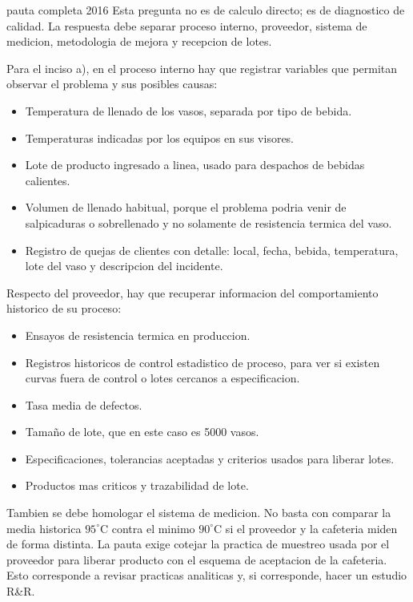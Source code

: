 \begin{pautacompleta}{pauta completa 2016}
Esta pregunta no es de calculo directo; es de diagnostico de calidad. La respuesta debe separar proceso interno, proveedor, sistema de medicion, metodologia de mejora y recepcion de lotes.

Para el inciso a), en el proceso interno hay que registrar variables que permitan observar el problema y sus posibles causas:
\begin{itemize}
  \item Temperatura de llenado de los vasos, separada por tipo de bebida.
  \item Temperaturas indicadas por los equipos en sus visores.
  \item Lote de producto ingresado a linea, usado para despachos de bebidas calientes.
  \item Volumen de llenado habitual, porque el problema podria venir de salpicaduras o sobrellenado y no solamente de resistencia termica del vaso.
  \item Registro de quejas de clientes con detalle: local, fecha, bebida, temperatura, lote del vaso y descripcion del incidente.
\end{itemize}

Respecto del proveedor, hay que recuperar informacion del comportamiento historico de su proceso:
\begin{itemize}
  \item Ensayos de resistencia termica en produccion.
  \item Registros historicos de control estadistico de proceso, para ver si existen curvas fuera de control o lotes cercanos a especificacion.
  \item Tasa media de defectos.
  \item Tamaño de lote, que en este caso es 5000 vasos.
  \item Especificaciones, tolerancias aceptadas y criterios usados para liberar lotes.
  \item Productos mas criticos y trazabilidad de lote.
\end{itemize}

Tambien se debe homologar el sistema de medicion. No basta con comparar la media historica $95^\circ\text{C}$ contra el minimo $90^\circ\text{C}$ si el proveedor y la cafeteria miden de forma distinta. La pauta exige cotejar la practica de muestreo usada por el proveedor para liberar producto con el esquema de aceptacion de la cafeteria. Esto corresponde a revisar practicas analiticas y, si corresponde, hacer un estudio R\&R.


\end{pautacompleta}
